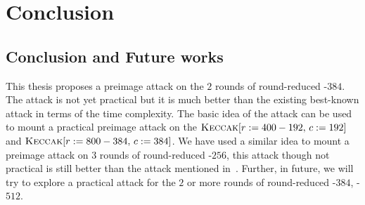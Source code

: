 \chapter{Conclusion}

\section{Conclusion and Future works}
This thesis proposes a preimage attack on the $2$ rounds of round-reduced \KECCAK-$384$. The attack is not yet practical but it is much better than the existing best-known attack in terms of the time complexity. The basic idea of the attack can be used to mount a practical preimage attack on the $\mbox{\textsc{Keccak}}[r:=400-192,\, c:=192]$ and $\mbox{\textsc{Keccak}}[r:=800-384,\,c:=384]$. 
We have used a similar idea to mount a preimage attack on $3$ rounds of round-reduced \KECCAK-$256$, this attack though not practical is still better than the attack mentioned in~\cite{guo2016linear}.
Further, in future, we will try to explore a practical attack for the $2$ or more rounds of round-reduced \KECCAK-$384$, \KECCAK-$512$.

